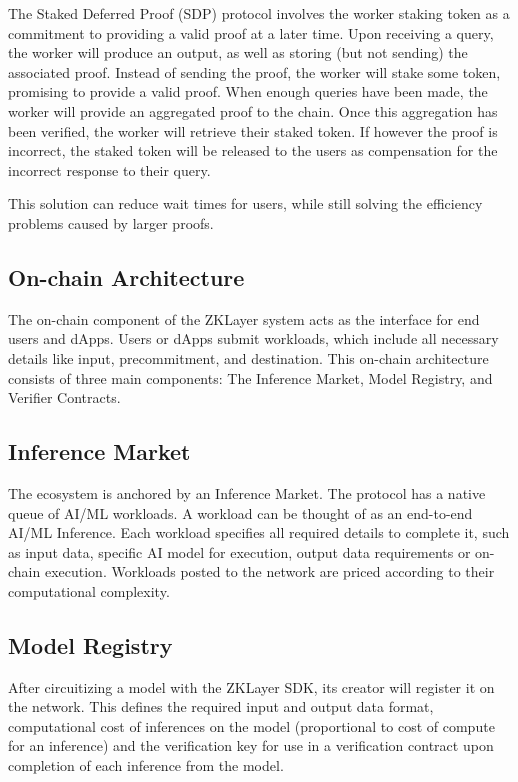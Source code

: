 \documentclass[conference]{IEEEtran}
\begin{document}
The Staked Deferred Proof (SDP) protocol involves the worker staking token as a commitment to providing a valid proof at a later time. Upon receiving a query, the worker will produce an output, as well as storing (but not sending) the associated proof. Instead of sending the proof, the worker will stake some token, promising to provide a valid proof. When enough queries have been made, the worker will provide an aggregated proof to the chain. Once this aggregation has been verified, the worker will retrieve their staked token. If however the proof is incorrect, the staked token will be released to the users as compensation for the incorrect response to their query.

This solution can reduce wait times for users, while still solving the efficiency problems caused by larger proofs. 

\subsection{On-chain Architecture}

The on-chain component of the ZKLayer system acts as the interface for end users and dApps.  Users or dApps submit workloads, which include all necessary details like input, precommitment, and destination. This on-chain architecture consists of three main components: The Inference Market, Model Registry, and Verifier Contracts.

\subsection{Inference Market}

The ecosystem is anchored by an Inference Market. The protocol has a native queue of AI/ML workloads. A workload can be thought of as an end-to-end AI/ML Inference. Each workload specifies all required details to complete it, such as input data, specific AI model for execution, output data requirements or on-chain execution. Workloads posted to the network are priced according to their computational complexity.

\subsection{Model Registry}

After circuitizing a model with the ZKLayer SDK, its creator will register it on the network. This defines the required input and output data format, computational cost of inferences on the model (proportional to cost of compute for an inference) and the verification key for use in a verification contract upon completion of each inference from the model.
\end{document}
